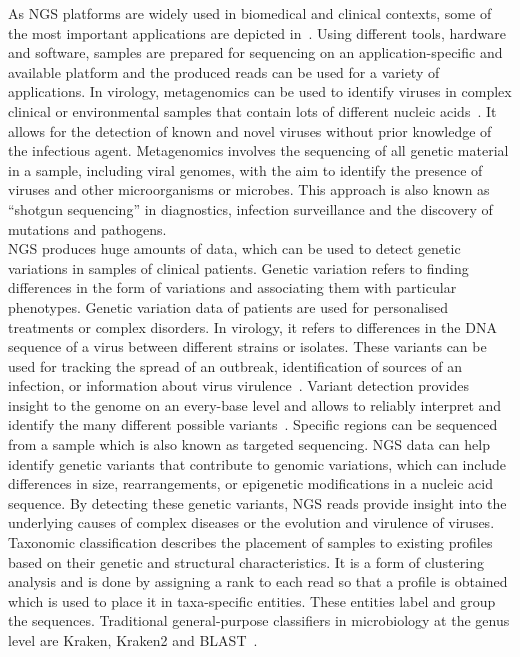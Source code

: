 As \ac{NGS} platforms are widely used in biomedical and clinical contexts, some of the most important applications are depicted in~. Using different tools, hardware and software, samples are prepared for sequencing on an application-specific and available platform and the produced reads can be used for a variety of applications. In virology, metagenomics can be used to identify viruses in complex clinical or environmental samples that contain lots of different nucleic acids~\cite{chiu2019clinical}. It allows for the detection of known and novel viruses without prior knowledge of the infectious agent. Metagenomics involves the sequencing of all genetic material in a sample, including viral genomes, with the aim to identify the presence of viruses and other microorganisms or microbes. This approach is also known as ``shotgun sequencing'' in diagnostics, infection surveillance and the discovery of mutations and pathogens. \\
\ac{NGS} produces huge amounts of data, which can be used to detect genetic variations in samples of clinical patients. Genetic variation refers to finding differences in the form of variations and associating them with particular phenotypes. Genetic variation data of patients are used for personalised treatments or complex disorders. In virology, it refers to differences in the \ac{DNA} sequence of a virus between different strains or isolates. These variants can be used for tracking the spread of an outbreak, identification of sources of an infection, or information about virus virulence~\cite{capobianchi2013next}. Variant detection provides insight to the genome on an every-base level and allows to reliably interpret and identify the many different possible variants~\cite{koboldt2013next}. Specific regions can be sequenced from a sample which is also known as targeted sequencing. \ac{NGS} data can help identify genetic variants that contribute to genomic variations, which can include differences in size, rearrangements, or epigenetic modifications in a nucleic acid sequence. By detecting these genetic variants, \ac{NGS} reads provide insight into the underlying causes of complex diseases or the evolution and virulence of viruses. \\ 
Taxonomic classification describes the placement of samples to existing profiles based on their genetic and structural characteristics. It is a form of clustering analysis and is done by assigning a rank to each read so that a profile is obtained which is used to place it in taxa-specific entities. These entities label and group the sequences. Traditional general-purpose classifiers in microbiology at the genus level are Kraken, Kraken2 and \ac{BLAST}~\cite{wood2014kraken, wood2019improved, altschul1997gapped}.
